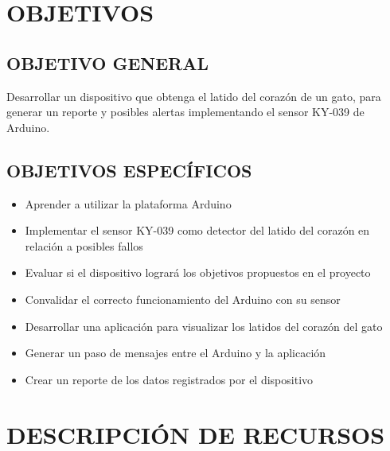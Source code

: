 \documentclass[letterpaper, 10 pt, conference]{ieeeconf}  %
\begin{document}
\section{OBJETIVOS}

\subsection{OBJETIVO GENERAL}

Desarrollar un dispositivo que obtenga el latido del coraz\'on de un gato, para generar un reporte y posibles alertas implementando el sensor KY-039 de Arduino.

\subsection{OBJETIVOS ESPEC\'IFICOS}

\begin{itemize}
    \item Aprender a utilizar la plataforma Arduino
    \item Implementar el sensor KY-039 como detector del latido del coraz\'on en relaci\'on a posibles fallos
    \item Evaluar si el dispositivo lograr\'a los objetivos propuestos en el proyecto
    \item Convalidar el correcto funcionamiento del Arduino con su sensor
    \item Desarrollar una aplicaci\'on para visualizar los latidos del coraz\'on del gato
    \item Generar un paso de mensajes entre el Arduino y la aplicaci\'on 
    \item Crear un reporte de los datos registrados por el dispositivo
\end{itemize}

\section{DESCRIPCI\'ON DE RECURSOS}
\end{document}
